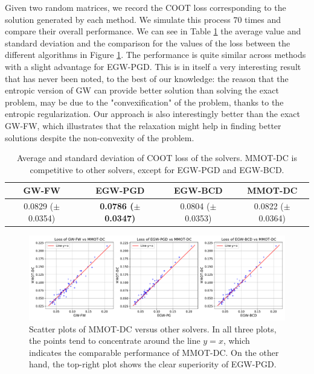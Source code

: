Given two random matrices, we record the COOT loss corresponding to the solution generated by each method.
We simulate this process $70$ times and compare their overall performance. We can see in Table \ref{tab:gw} the average value and
standard deviation and the comparison for the values of the loss between the different algorithms in Figure \ref{fig:gw}.
The performance is quite similar across methods with a  slight advantage for EGW-PGD. This is in itself a very
interesting result that has never been noted, to the best of our knowledge: the reason that the entropic version of GW can
provide better solution than solving the exact problem, may be due to the "convexification" of the problem, thanks to the entropic
regularization. Our approach is also interestingly better than the exact GW-FW, which illustrates that the relaxation might help in
finding better solutions despite the non-convexity of the problem.
\begin{table}[t]
  \begin{center}
    \begin{small}
      \begin{sc}
        \begin{tabular}{|c|c|c|c|}
          \hline
          GW-FW & EGW-PGD & EGW-BCD & MMOT-DC \\
          \hline
          0.0829 ($\pm$ 0.0354) & \textbf{0.0786 ($\pm$ 0.0347)} & 0.0804 ($\pm$ 0.0353) & 0.0822 ($\pm$ 0.0364) \\
          \hline
        \end{tabular}
      \end{sc}
    \end{small}
  \end{center}
  \caption{Average and standard deviation of COOT loss of the solvers. MMOT-DC is competitive to other solvers,
  except for EGW-PGD and EGW-BCD.
  \label{tab:gw}}
\end{table}

\begin{figure}[t]
	\centering
	\includegraphics[width=\textwidth,height=\textheight,keepaspectratio]{./Chapitre2/fig/all_vs_MMOT-DC.pdf}
	\caption{Scatter plots of MMOT-DC versus other solvers. In all three plots, the points tend to concentrate around the line $y=x$,
  which indicates the comparable performance of MMOT-DC. On the other hand, the top-right plot shows the clear superiority of EGW-PGD.}
	\label{fig:gw}
\end{figure}

